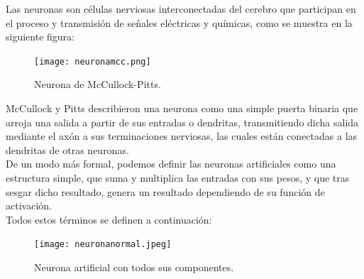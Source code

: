 \documentclass[a4paper,11pt]{article}
\begin{document}
\noindent
 Las neuronas son células nerviosas interconectadas del cerebro que participan en el proceso y transmisión de señales eléctricas y químicas, como se muestra en la siguiente figura: \\

\begin{figure}[H]
\centering
\texttt{[image: neuronamcc.png]}
\caption{Neurona de McCullock-Pitts.}
\end{figure}
\noindent
McCullock y Pitts describieron una neurona como una simple puerta binaria que arroja una salida a partir de sus entradas o dendritas, transmitiendo dicha salida mediante el axón a sus terminaciones nerviosas, las cuales están conectadas a las dendritas de otras neuronas.\\

\noindent
De un modo más formal, podemos definir las neuronas artificiales como una estructura simple, que suma y multiplica las entradas con sus pesos, y que tras sesgar dicho resultado, genera un resultado dependiendo de su función de activación. \\

\noindent
Todos estos términos se definen a continuación:
\begin{figure}[H]
\centering
\texttt{[image: neuronanormal.jpeg]}
\caption{Neurona artificial con todos sus componentes.}
\end{figure}
\end{document}
